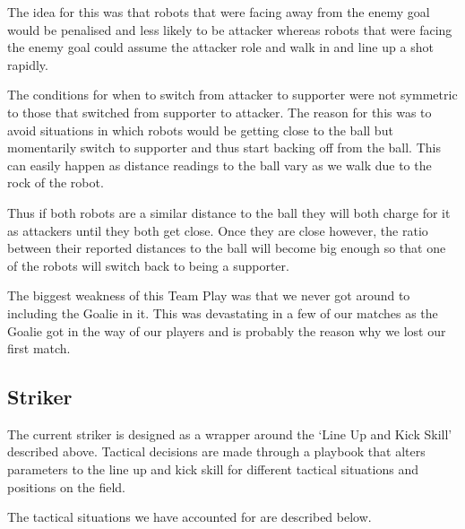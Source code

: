 \documentclass[pdftex,11pt,a4paper]{report}
\begin{document}
The idea for this was that robots that were facing away from the enemy goal would be penalised and less likely to be attacker whereas robots that were facing the enemy goal could assume the attacker role and walk in and line up a shot rapidly.

The conditions for when to switch from attacker to supporter were not symmetric to those that switched from supporter to attacker. The reason for this was to avoid situations in which robots would be getting close to the ball but momentarily switch to supporter and thus start backing off from the ball. This can easily happen as distance readings to the ball vary as we walk due to the rock of the robot.

Thus if both robots are a similar distance to the ball they will both charge for it as attackers until they both get close. Once they are close however, the ratio between their reported distances to the ball will become big enough so that one of the robots will switch back to being a supporter.

The biggest weakness of this Team Play was that we never got around to including the Goalie in it. This was devastating in a few of our matches as the Goalie got in the way of our players and is probably the reason why we lost our first match.

\subsection{Striker}
The current striker is designed as a wrapper around the `Line Up and Kick Skill' described above. Tactical decisions are made through a playbook that alters parameters to the line up and kick skill for different tactical situations and positions on the field. 

The tactical situations we have accounted for are described below.
\end{document}
